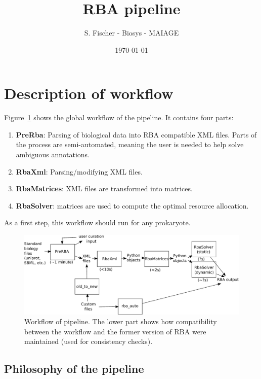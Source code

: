 \documentclass[12pt]{scrartcl}
\newcommand\reft[3][]{#2~\ref{#3}#1}
\theoremstyle{definition}
\theoremstyle{remark}
\numberwithin{equation}{section}
\newcommand\reffigt[2][]{\reft[#1]{Figure}{#2}}
\begin{document}
\title{RBA pipeline}%
\author{S. Fischer - Biosys - MAIAGE}%
\date{\today}%

\maketitle

\newpage

\tableofcontents

\newpage

\section{Description of workflow}

\reffigt{fig:workflow} shows the global workflow of the pipeline. It contains four parts:
\begin{enumerate}
\item \textbf{PreRba}: Parsing of biological data into RBA compatible XML files. Parts of the process are semi-automated, meaning the user is needed to help solve ambiguous annotations.
\item \textbf{RbaXml}: Parsing/modifying XML files.
\item \textbf{RbaMatrices}: XML files are transformed into matrices.
\item \textbf{RbaSolver}: matrices are used to compute the optimal resource allocation.
\end{enumerate}
As a first step, this workflow should run for any prokaryote.

\begin{figure}[ht]
  \centering
  \includegraphics[width=\linewidth]{workflow}
  \caption{Workflow of pipeline. The lower part shows how compatibility between the workflow and the former version of RBA were maintained (used for consistency checks).}
  \label{fig:workflow}
\end{figure}

\subsection{Philosophy of the pipeline}
\end{document}
